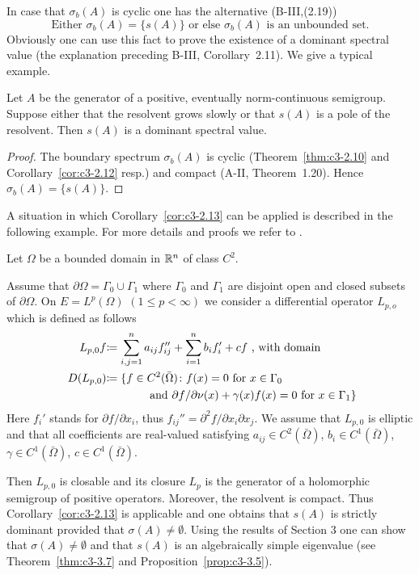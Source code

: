In case that $\sigma_{b}(A)$ is cyclic one has the alternative (\cf B-III,(2.19))
\[
\text{Either $\sigma_{b}(A) = \{s(A)\}$ or else $\sigma_{b}(A)$ is an unbounded set.}
\]
Obviously one can use this fact to prove the existence of a dominant spectral value (\cf the explanation preceding B-III, Corollary~2.11).
We give a typical example.
\begin{corollary}\label{cor:c3-2.13}
	Let $A$ be the generator of a positive, eventually norm-continuous semigroup.
	Suppose either that the resolvent grows slowly or that $s(A)$ is a pole of the resolvent.
	Then $s(A)$ is a dominant spectral value.
\end{corollary}
\begin{proof}
The boundary spectrum $\sigma_{b}(A)$ is cyclic (Theorem~\ref{thm:c3-2.10} and Corollary~\ref{cor:c3-2.12} resp.) and compact (A-II, Theorem~1.20).
Hence $\sigma_{b}(A) = \{s(A)\}$.
\end{proof}
A situation in which Corollary~\ref{cor:c3-2.13} can be applied is described in the following example.
For more details and proofs we refer to \citet{amann:1983}.
\begin{example}\label{ex:c3-2.14}
	Let $\Omega$ be a bounded domain in $\mathbb{R} ^{n}$ of class $C^{2}$.
	
	Assume that $\partial\Omega = \Gamma_{0}\cup\Gamma_{1}$ where $\Gamma_{0}$ and $\Gamma_{1}$ are disjoint open and closed subsets of $\partial\Omega$.
    On $E = L^{p}(\Omega)$ $(1 \leq p < \infty)$ we consider a differential operator $L_{p,o}$ which is defined as follows
\begin{equation}\label{eq:c3-2.23}
	\begin{aligned}
\text{$L_{p,0}f$} &\text{$\coloneqq \sum_{i,j=1}^{n} a_{ij} f_{ij}'' + \sum_{i=1}^{n} b_{i} f_{i}' + cf$ , with domain} \\
\text{ $D(L_{p,0})$} & \text{$\coloneqq \{f \in C^{2}(\bar{\Omega}) \colon$} 
\text{$ f(x) = 0$ for $x \in \Gamma_{0}$}\\ 
& \text{\phantom{aaaaaaa} and $\partial f/\partial\nu (x) + \gamma(x)f(x) = 0$ for $x \in \Gamma_{1}\}$}
	\end{aligned}
\end{equation}
Here $f_{i}'$ stands for $\partial f/\partial x_{i}$, thus $f_{ij}'' = \partial^{2}f/\partial x_{i}\partial x_{j}$.
We assume that $L_{p,0}$ is elliptic and that all coefficients are real-valued satisfying $a_{ij} \in C^{2}(\bar{\Omega})$, $b_{i} \in C^{1}(\bar{\Omega})$, $\gamma \in C^{1}(\bar{\Omega})$, $c \in C^{1}(\bar{\Omega})$.

Then $L_{p,0}$ is closable and its closure $L_{p}$ is the generator of a holomorphic semigroup of positive operators.
Moreover, the resolvent is compact.
Thus Corollary~\ref{cor:c3-2.13} is applicable and one obtains that $s(A)$ is strictly dominant provided that $\sigma(A) \neq \emptyset$.
Using the results of Section 3 one can show that $\sigma(A) \neq \emptyset$ and that $s(A)$ is an algebraically simple eigenvalue (see Theorem~\ref{thm:c3-3.7} and Proposition~\ref{prop:c3-3.5}).
\end{example}
